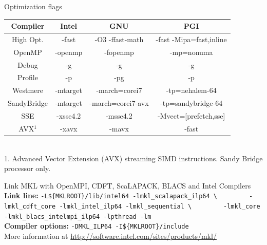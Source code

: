 \documentclass[final,t]{beamer}
\begin{document}
\begin{frame}[fragile]{}
\begin{columns}[t]
\begin{column}{.32\linewidth}
 
      \begin{block}{Optimization flags}
        \vspace*{-2ex}
           \begin{center}
           \begin{tabular}{|c|c|c|c|}
           \hline 
           \textbf{Compiler} & \textbf{Intel} & \textbf{GNU} & \textbf{PGI} \\ 
           \hline 
           High Opt. & -fast & -O3 -ffast-math & -fast -Mipa=fast,inline \\ 
           \hline 
           OpenMP & -openmp & -fopenmp & -mp=nonuma \\ 
           \hline 
           Debug & -g & -g & -g \\ 
           \hline 
           Profile & -p & -pg & -p \\ 
           \hline 
           Westmere & -mtarget & -march=corei7  & -tp=nehalem-64 \\ 
           \hline 
           SandyBridge & -mtarget & -march=corei7-avx  & -tp=sandybridge-64 \\ 
           \hline 
           SSE & -xsse4.2 & -msse4.2 & -Mvect=[prefetch,sse] \\ 
           \hline 
           AVX$^1$ & -xavx & -mavx & -fast \\ 
           \hline 
           \end{tabular} 
           \begin{footnotesize}
            \\1. Advanced Vector Extension (AVX) streaming SIMD instructions. Sandy Bridge processor only.
           \end{footnotesize}
           \end{center}
        \vspace*{-2ex}
      \end{block}
     
      \begin{block}{Link MKL with OpenMPI, CDFT, ScaLAPACK, BLACS and Intel Compilers}
      \textbf{Link line:} \verb|-L${MKLROOT}/lib/intel64 -lmkl_scalapack_ilp64 \|
      \verb|        -lmkl_cdft_core -lmkl_intel_ilp64 -lmkl_sequential \|
      \verb|        -lmkl_core -lmkl_blacs_intelmpi_ilp64 -lpthread -lm|\\
      \textbf{Compiler options: }      \verb|-DMKL_ILP64 -I${MKLROOT}/include|\\
      More information at \url{http://software.intel.com/sites/products/mkl/}
      \end{block}
 

\end{column}
\end{columns}
\end{frame}
\end{document}
